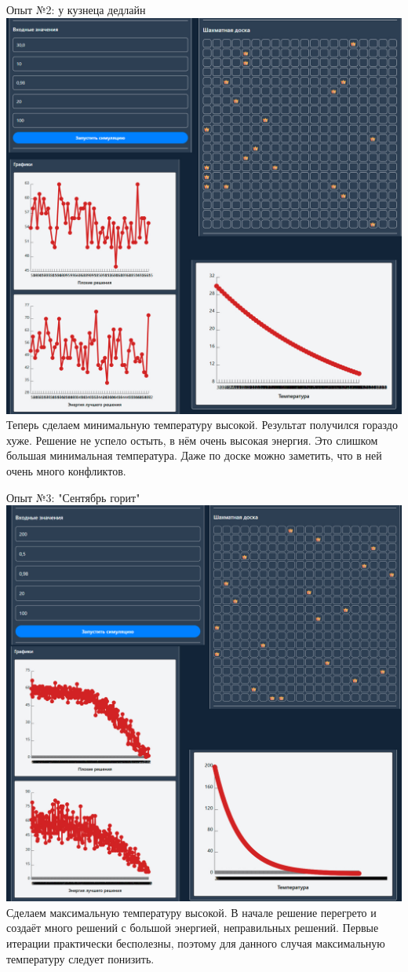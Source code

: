 \documentclass[a4paper,14pt]{extarticle}
\begin{document}
Опыт №2: у кузнеца дедлайн\\
\includegraphics[width=140mm]{report2}\\
Теперь сделаем минимальную температуру высокой. Результат получился гораздо хуже. Решение не успело остыть, 
в нём очень высокая энергия. Это слишком большая минимальная температура. Даже по доске можно заметить, 
что в ней очень много конфликтов.\bigbreak

Опыт №3: "Сентябрь горит"\\
\includegraphics[width=140mm]{report3}\\
Сделаем максимальную температуру высокой. В начале решение перегрето и создаёт много решений с большой энергией, 
неправильных решений. Первые итерации практически бесполезны, поэтому для данного случая максимальную
температуру следует понизить.\bigbreak
\end{document}
